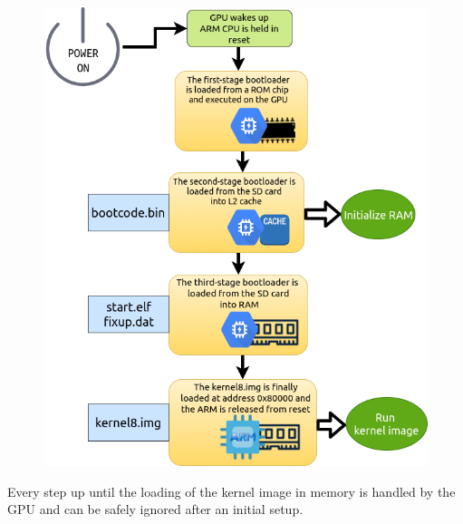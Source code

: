 \documentclass[12pt,a4paper,openright,twoside]{report}
\begin{document}
 \begin{figure}[t]
 \includegraphics[scale=0.6234]{tesi1.png}
 \end{figure}
 \clearpage

Every step up until the loading of the kernel image in memory is handled by 
the GPU and can be safely ignored after an initial setup.
\end{document}
